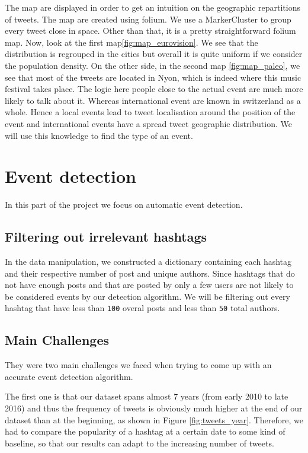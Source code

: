 \documentclass[11pt]{article}
\begin{document}
The map are displayed in order to get an intuition on the geographic repartitions of tweets. The map are created using folium. We use a MarkerCluster to group every tweet close in space. Other than that, it is a pretty straightforward folium map. Now, look at the first map\ref{fig:map_eurovision}. We see that the distribution is regrouped in the cities but overall it is quite uniform if we consider the population density. On the other side, in the second map \ref{fig:map_paleo}, we see that most of the tweets are located in Nyon, which is indeed where this music festival takes place. The logic here people close to the actual event are much more likely to talk about it. Whereas international event are known in switzerland as a whole. Hence a local events lead to tweet localisation around the position of the event and international events have a spread tweet geographic distribution. We will use this knowledge to find the type of an event.


\section{Event detection}

In this part of the project we focus on automatic event detection.

\subsection{Filtering out irrelevant hashtags}

In the data manipulation, we constructed a dictionary containing each hashtag and their respective number of post and unique authors.
Since hashtags that do not have enough posts and that are posted by only a few users are not likely to be considered events by our detection algorithm. We will be filtering out every hashtag that have less than \texttt{100} overal posts and less than \texttt{50} total authors. 

\subsection{Main Challenges}
They were two main challenges we faced when trying to come up with an accurate event detection algorithm. 

The first one is that our dataset spans almost 7 years (from early 2010 to late 2016) and thus the frequency of tweets is obviously much higher at the end of our dataset than at the beginning, as shown in Figure \ref{fig:tweets_year}. Therefore, we had to compare the popularity of a hashtag at a certain date to some kind of baseline, so that our results can adapt to the increasing number of tweets.
\end{document}
